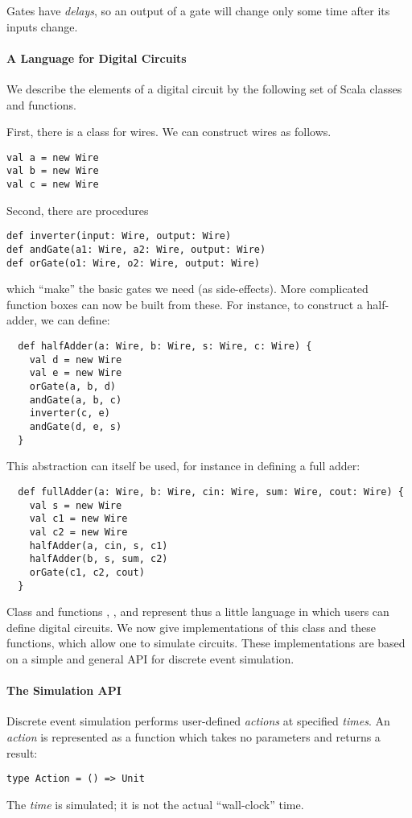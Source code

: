 {Gates have {\em delays}, so an output of a gate will change only some
time after its inputs change.

\paragraph{A Language for Digital Circuits}

We describe the elements of a digital circuit by the following set of
Scala classes and functions.

First, there is a class  for wires.
We can construct wires as follows.
\begin{lstlisting}
val a = new Wire
val b = new Wire
val c = new Wire
\end{lstlisting}
Second, there are procedures
\begin{lstlisting}
def inverter(input: Wire, output: Wire)
def andGate(a1: Wire, a2: Wire, output: Wire)
def orGate(o1: Wire, o2: Wire, output: Wire)
\end{lstlisting}
which ``make'' the basic gates we need (as side-effects).
More complicated function boxes can now be built from these.
For instance, to construct a half-adder, we can define:
\begin{lstlisting}
  def halfAdder(a: Wire, b: Wire, s: Wire, c: Wire) {
    val d = new Wire
    val e = new Wire
    orGate(a, b, d)
    andGate(a, b, c)
    inverter(c, e)
    andGate(d, e, s)
  }
\end{lstlisting}
This abstraction can itself be used, for instance in defining a full
adder:
\begin{lstlisting}
  def fullAdder(a: Wire, b: Wire, cin: Wire, sum: Wire, cout: Wire) {
    val s = new Wire
    val c1 = new Wire
    val c2 = new Wire
    halfAdder(a, cin, s, c1)
    halfAdder(b, s, sum, c2)
    orGate(c1, c2, cout)
  }
\end{lstlisting}
Class  and functions , , and
 represent thus a little language in which users can
define digital circuits.  We now give implementations of this class
and these functions, which allow one to simulate circuits.
These implementations are based on a simple and general API for
discrete event simulation.

\paragraph{The Simulation API}

Discrete event simulation performs user-defined \emph{actions} at
specified \emph{times}.  
An {\em action} is represented as a function which takes no parameters and
returns a  result:
\begin{lstlisting}
type Action = () => Unit
\end{lstlisting}
The \emph{time} is simulated; it is not the actual ``wall-clock'' time.

}
